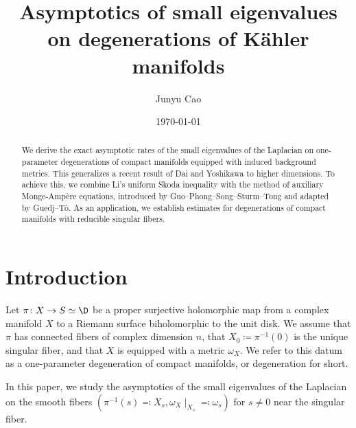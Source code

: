 \documentclass[12pt]{amsart}
\title[small eigenvalues on K\"ahler degeneration]{Asymptotics of small eigenvalues
on degenerations of K\"ahler manifolds}
\date{\today}
\author{Junyu Cao \orcidlink{0009-0003-6875-3981}}
\begin{document}
\begin{abstract} 
    We derive the exact asymptotic rates of the small 
    eigenvalues of the Laplacian on one-parameter 
    degenerations of compact \Kahler manifolds equipped 
    with induced background metrics. 
    This generalizes a recent result of Dai and Yoshikawa 
    to higher dimensions. 
    To achieve this, we combine Li's uniform Skoda inequality 
    with the method of auxiliary Monge-Amp\`ere equations, 
    introduced by Guo--Phong--Song--Sturm--Tong and 
    adapted by Guedj--T\^o. As an application, we 
    establish estimates for degenerations 
    of compact \Kahler manifolds with reducible singular 
    fibers.
\end{abstract}
\maketitle
\setcounter{tocdepth}{2}
\tableofcontents
\section*{Introduction}
Let \(\pi\colon X \to S \simeq \D\) be a proper surjective holomorphic map from a
complex manifold \(X\) to a Riemann surface biholomorphic to the unit disk.
We assume that \(\pi\) has connected fibers of complex dimension \(n\), that
\(X_0 \coloneqq \pi^{-1}(0)\) is the unique singular fiber, and that \(X\) is
equipped with a \Kahler metric \(\omega_X\). We refer to this datum as a
one-parameter degeneration of compact \Kahler manifolds, or 
{\Kahler degeneration} for short.

In this paper, we study the asymptotics of the 
{small eigenvalues} of the Laplacian on the smooth fibers
$(\pi^{-1}(s)\eqqcolon X_s, 
\omega_{X} \mid_{X_s}\eqqcolon \omega_s)$ 
for $s \neq 0$ near the singular fiber.
\end{document}
